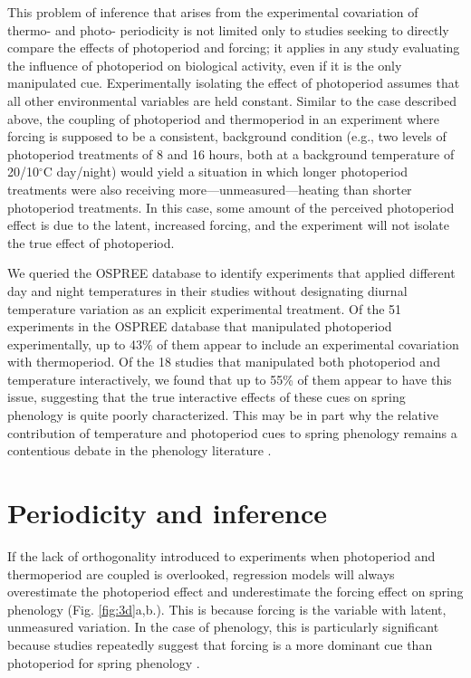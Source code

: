 \documentclass[11pt]{article}
\begin{document}
This problem of inference that arises from the experimental covariation of thermo- and photo- periodicity is not limited only to studies seeking to directly compare the effects of photoperiod and forcing; it applies in any study evaluating the influence of photoperiod on biological activity, even if it is the only manipulated cue. Experimentally isolating the effect of photoperiod assumes that all other environmental variables are held constant.  Similar to the case described above, %
the coupling of photoperiod and thermoperiod in an experiment where forcing is supposed to be a consistent, background condition (e.g., two levels of photoperiod treatments of 8 and 16 hours, both at a background temperature of 20/10$^{\circ}$C day/night) would yield a situation in which longer photoperiod treatments were also receiving more---unmeasured---heating than shorter photoperiod treatments. In this case, some amount of the perceived photoperiod effect is due to the latent, increased forcing, and the experiment will not isolate the true effect of photoperiod.

We queried the OSPREE database to identify experiments that applied different day and night temperatures in their studies without designating diurnal temperature variation as an explicit experimental treatment. Of the 51 experiments in the OSPREE database that manipulated photoperiod experimentally, up to 43\% of them appear to include an experimental covariation with thermoperiod. Of the 18 studies that manipulated both photoperiod and temperature interactively, we found that up to 55\% of them appear to have this issue, suggesting that the true interactive effects of these cues on spring phenology is quite poorly characterized. This may be in part why the relative contribution of temperature and photoperiod cues to spring phenology remains a contentious debate in the phenology literature \citep{koerner2010a,CHUINE:2010wg,Jennifer:2010un}.

\section*{Periodicity and inference}
If the lack of orthogonality introduced to experiments when photoperiod and thermoperiod are coupled is overlooked, regression models will always overestimate the photoperiod effect and underestimate the forcing effect on spring phenology 
(Fig. \ref{fig:3d}a,b.). This is because forcing is the variable with latent, unmeasured variation. In the case of phenology, this is particularly significant because studies repeatedly suggest that forcing is a more dominant cue than photoperiod for spring phenology \citep{CHUINE:2010wg,Zohner:2016uz,Gauzere2019}.
\end{document}
